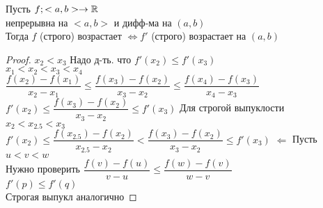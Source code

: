 \begin{theorem}
	Пусть $ f ; <a,b> \rightarrow \mathbb{R} $ \\
	непрерывна на  $ <a,b> $ и дифф-ма на  $ (a,b) $ \\
	Тогда $ f $ (строго) возрастает $ \Leftrightarrow  f' $ (строго) возрастает на $ (a,b) $ \\
	\begin{proof}
		$ x_2 < x_3 $ Надо д-ть. что $ f'(x_2) \leq f'(x_3) $ \\
		$ x_1 < x_2 < x_3 < x_4 $ \\
		$ \dfrac{f(x_2) - f(x_1)}{x_2 - x_1} \leq \dfrac{f(x_3) - f(x_2)}{x_3 - x_2} \leq \dfrac{f(x_4) - f(x_3)}{x_4 - x_3} $\\%
		$ f'(x_2) \leq \dfrac{f(x_3) - f(x_2)}{x_3 - x_2} \leq f'(x_3) $ 
			Для строгой выпуклости \\
		$ x_2 < x_{2.5} < x_3 $ \\
		$ f'(x_2) \leq  \dfrac{f(x_{2.5}) - f(x_2)}{x_{2.5} - x_2} <  \dfrac{f(x_3) - f(x_2)}{x_3 - x_2} \leq f'(x_3) $
		$ \Leftarrow $ Пусть $ u < v < w $ \\
		Нужно проверить $ \dfrac{f(v) - f(u)}{v - u} \leq \dfrac{f(w) - f(v)}{w - v}  $ \\%
		$ f'(p) \leq f'(q) $ \\
		Строгая выпукл аналогично
	\end{proof}
\end{theorem}

